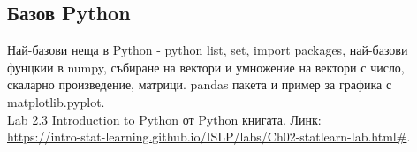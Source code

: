  	\subsection{Базов Python}
 	Най-базови неща в Python - python list, set, import packages, най-базови фунцкии в numpy,
 	събиране на вектори и умножение на вектори с число, скаларно произведение, матрици.
 	pandas пакета и пример за графика с matplotlib.pyplot.\\
 	
 	Lab 2.3 Introduction to Python от Python книгата. Линк: \\

 	\href{https://intro-stat-learning.github.io/ISLP/labs/Ch02-statlearn-lab.html#}{https://intro-stat-learning.github.io/ISLP/labs/Ch02-statlearn-lab.html\#}.
